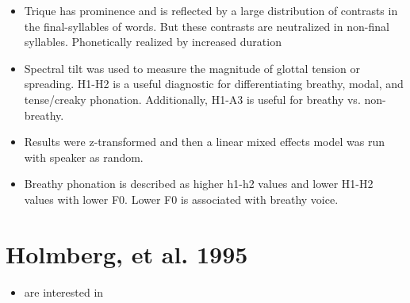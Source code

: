 \documentclass[12pt, letterpaper]{article}
\begin{document}
\begin{itemize}
	\item Trique has prominence and is reflected by a large distribution of contrasts in the final-syllables of words. But these contrasts are neutralized in non-final syllables. Phonetically realized by increased duration
	
	\item Spectral tilt was used to measure the magnitude of glottal tension or spreading. H1-H2 is a useful diagnostic for differentiating breathy, modal, and tense/creaky phonation. Additionally, H1-A3 is useful for breathy vs. non-breathy.
	
	\item Results were z-transformed and then a linear mixed effects model was run with speaker as random.
	
	\item Breathy phonation is described as higher h1-h2 values and lower H1-H2 values with lower F0. Lower F0 is associated with breathy voice.
\end{itemize}

\section{Holmberg, et al. 1995} \label{sec:Holmberg}

\begin{itemize}
	\item \citet{holmbergComparisonsAerodynamicElectroglottographic1995} are interested in 
\end{itemize}







\printbibliography[heading=bibintoc]
\end{document}
